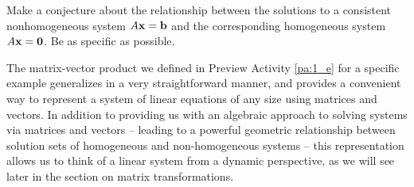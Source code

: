 \begin{pa}
	\item Make a conjecture about the relationship between the solutions to a consistent nonhomogeneous system $A \mathbf{x} = \mathbf{b}$ and the corresponding homogeneous system $A \mathbf{x} = \mathbf{0}$. Be as specific as possible.

	
	\ea

\ee

\end{pa} 



\label{sec:mv_prod}

The matrix-vector product we defined in Preview Activity \ref{pa:1_e} for a specific example generalizes in a very straightforward manner, and provides a convenient way to represent a system of linear equations of any size using matrices and vectors. In addition to providing us with an algebraic approach to solving systems via matrices and vectors -- leading to a powerful geometric relationship between solution sets of homogeneous and non-homogeneous systems -- this representation allows us to think of a linear system from a dynamic perspective, as we will see later in the section on matrix transformations. 


